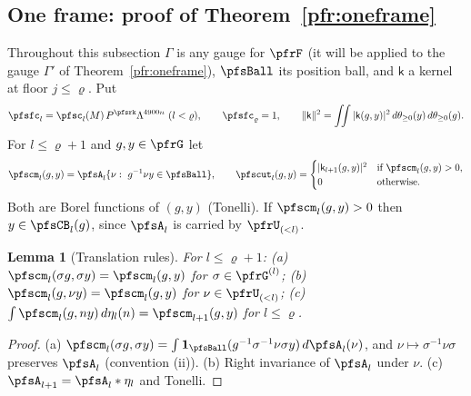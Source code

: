 \documentclass[10pt]{amsart}
\newtheorem{lemma}[theorem]{Lemma}
\theoremstyle{definition}
\theoremstyle{remark}
\begin{document}
\subsection{One frame: proof of Theorem~\ref{pfr:oneframe}}\label{pfs:ss-oneframe}

Throughout this subsection $\Gamma$ is any gauge for $\pfrF$ (it will be applied to the gauge $\Gamma'$ of
Theorem~\ref{pfr:oneframe}), $\pfsBall$ its position ball, and $\mathsf k$ a kernel at floor $j\le\varrho$. Put
\[
\pfsfc_l=\pfsc_l(M)\,P^{\pfsrk}\Lambda^{4900n}\ (l<\varrho),\qquad\pfsfc_\varrho=1,\qquad
\|\mathsf k\|^2=\iint|\mathsf k(g,y)|^2\,d\theta_{\ge0}(y)\,d\theta_{\ge0}(g).
\]
For $l\le\varrho+1$ and $g,y\in\pfrG$ let
\[
\pfscm_l(g,y)=\pfsA_l\{\nu:\ g^{-1}\nu y\in\pfsBall\},\qquad
\pfscut_l(g,y)=\begin{cases}|\mathsf k_{l+1}(g,y)|^2&\text{if }\pfscm_l(g,y)>0,\\0&\text{otherwise}.\end{cases}
\]
Both are Borel functions of $(g,y)$ (Tonelli). If $\pfscm_l(g,y)>0$ then $y\in\pfsCB_l(g)$, since $\pfsA_l$ is carried by
$\pfrU_{(<l)}$.

\begin{lemma}[Translation rules]\label{pfs:cmrules}
For $l\le\varrho+1$: (a) $\pfscm_l(\sigma g,\sigma y)=\pfscm_l(g,y)$ for $\sigma\in\pfrG^{(l)}$; (b) $\pfscm_l(g,\nu y)=
\pfscm_l(g,y)$ for $\nu\in\pfrU_{(<l)}$; (c) $\int\pfscm_l(g,ny)\,d\eta_l(n)=\pfscm_{l+1}(g,y)$ for $l\le\varrho$.
\end{lemma}
\begin{proof}
(a) $\pfscm_l(\sigma g,\sigma y)=\int\mathbf 1_\pfsBall(g^{-1}\sigma^{-1}\nu\sigma y)\,d\pfsA_l(\nu)$, and $\nu\mapsto\sigma^{-1}\nu\sigma$
preserves $\pfsA_l$ (convention (ii)). (b) Right invariance of $\pfsA_l$ under $\nu$. (c) $\pfsA_{l+1}=\pfsA_l*\eta_l$ and Tonelli.
\end{proof}
\end{document}
